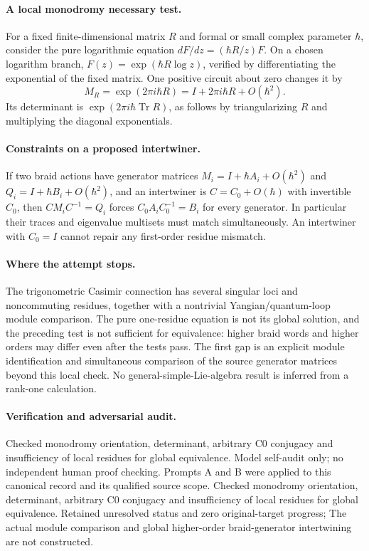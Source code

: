 \documentclass[11pt]{article}
\begin{document}
\paragraph{A local monodromy necessary test.} For a fixed finite-dimensional matrix $R$ and formal or small complex parameter $\hbar$, consider the pure logarithmic equation $dF/dz=(\hbar R/z)F$. On a chosen logarithm branch, $F(z)=\exp(\hbar R\log z)$, verified by differentiating the exponential of the fixed matrix. One positive circuit about zero changes it by
\[
 M_R=\exp(2\pi i\hbar R)=I+2\pi i\hbar R+O(\hbar^2).
\]
Its determinant is $\exp(2\pi i\hbar\operatorname{Tr}R)$, as follows by triangularizing $R$ and multiplying the diagonal exponentials.

\paragraph{Constraints on a proposed intertwiner.} If two braid actions have generator matrices $M_i=I+\hbar A_i+O(\hbar^2)$ and $Q_i=I+\hbar B_i+O(\hbar^2)$, and an intertwiner is $C=C_0+O(\hbar)$ with invertible $C_0$, then $CM_iC^{-1}=Q_i$ forces $C_0A_iC_0^{-1}=B_i$ for every generator. In particular their traces and eigenvalue multisets must match simultaneously. An intertwiner with $C_0=I$ cannot repair any first-order residue mismatch.

\paragraph{Where the attempt stops.} The trigonometric Casimir connection has several singular loci and noncommuting residues, together with a nontrivial Yangian/quantum-loop module comparison. The pure one-residue equation is not its global solution, and the preceding test is not sufficient for equivalence: higher braid words and higher orders may differ even after the tests pass. The first gap is an explicit module identification and simultaneous comparison of the source generator matrices beyond this local check. No general-simple-Lie-algebra result is inferred from a rank-one calculation.

\paragraph{Verification and adversarial audit.}
Checked monodromy orientation, determinant, arbitrary C0 conjugacy and insufficiency of local residues for global equivalence. Model self-audit only; no independent human proof checking. Prompts A and B were applied to this canonical record and its qualified source scope. Checked monodromy orientation, determinant, arbitrary C0 conjugacy and insufficiency of local residues for global equivalence. Retained unresolved status and zero original-target progress; The actual module comparison and global higher-order braid-generator intertwining are not constructed.
\end{document}
